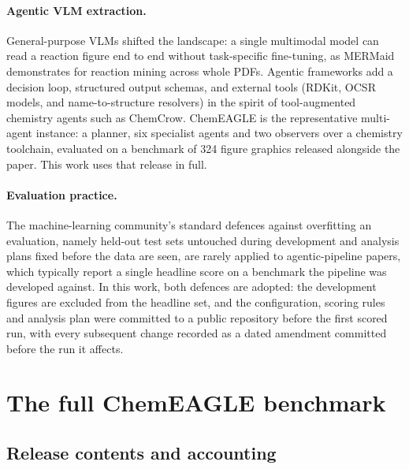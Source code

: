 \documentclass{article}
\begin{document}
\paragraph{Agentic VLM extraction.} General-purpose VLMs shifted the
landscape: a single multimodal model can read a reaction figure end to
end without task-specific fine-tuning, as MERMaid demonstrates for
reaction mining across whole PDFs.\citep{Leong2025MERMaid} Agentic
frameworks add a decision loop, structured output schemas, and external
tools (RDKit,\citep{RDKit} OCSR models,\citep{Chen2024MolNexTR} and
name-to-structure resolvers\citep{Lowe2011,Kim2016,CIR2024}) in the
spirit of tool-augmented chemistry agents such as
ChemCrow.\citep{Bran2024ChemCrow} ChemEAGLE\citep{Chen2025ChemEagle}
is the representative multi-agent instance: a planner, six specialist
agents and two observers over a chemistry toolchain, evaluated on a
benchmark of 324 figure graphics released alongside the paper. This
work uses that release in full.

\paragraph{Evaluation practice.} The machine-learning community's
standard defences against overfitting an evaluation, namely held-out
test sets untouched during development and analysis plans fixed before
the data are seen, are rarely applied to agentic-pipeline papers, which
typically report a single headline score on a benchmark the pipeline
was developed against. In this work, both defences are adopted: the
development figures are excluded from the headline set, and the
configuration, scoring rules and analysis plan were committed to a
public repository before the first scored run, with every subsequent
change recorded as a dated amendment committed before the run it
affects.

\section{The full ChemEAGLE benchmark}
\label{sec:benchmark}

\subsection{Release contents and accounting}
\label{sec:accounting}
\end{document}
